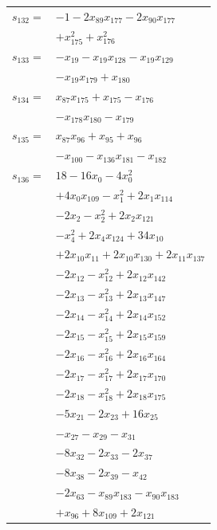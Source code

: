 \begin{longtable}{@{}r@{\;}l@{}}
\(s_{132}=\) & \(\displaystyle -1 -2x_{89}x_{177} -2x_{90}x_{177}\) \\
 & \(\displaystyle +x_{175}^{2} +x_{176}^{2}\) \\[3pt]
\(s_{133}=\) & \(\displaystyle -x_{19} -x_{19}x_{128} -x_{19}x_{129}\) \\
 & \(\displaystyle -x_{19}x_{179} +x_{180}\) \\[3pt]
\(s_{134}=\) & \(\displaystyle x_{87}x_{175} +x_{175} -x_{176}\) \\
 & \(\displaystyle -x_{178}x_{180} -x_{179}\) \\[3pt]
\(s_{135}=\) & \(\displaystyle x_{87}x_{96} +x_{95} +x_{96}\) \\
 & \(\displaystyle -x_{100} -x_{136}x_{181} -x_{182}\) \\[3pt]
\(s_{136}=\) & \(\displaystyle 18 -16x_{0} -4x_{0}^{2}\) \\
 & \(\displaystyle +4x_{0}x_{109} -x_{1}^{2} +2x_{1}x_{114}\) \\
 & \(\displaystyle -2x_{2} -x_{2}^{2} +2x_{2}x_{121}\) \\
 & \(\displaystyle -x_{4}^{2} +2x_{4}x_{124} +34x_{10}\) \\
 & \(\displaystyle +2x_{10}x_{11} +2x_{10}x_{130} +2x_{11}x_{137}\) \\
 & \(\displaystyle -2x_{12} -x_{12}^{2} +2x_{12}x_{142}\) \\
 & \(\displaystyle -2x_{13} -x_{13}^{2} +2x_{13}x_{147}\) \\
 & \(\displaystyle -2x_{14} -x_{14}^{2} +2x_{14}x_{152}\) \\
 & \(\displaystyle -2x_{15} -x_{15}^{2} +2x_{15}x_{159}\) \\
 & \(\displaystyle -2x_{16} -x_{16}^{2} +2x_{16}x_{164}\) \\
 & \(\displaystyle -2x_{17} -x_{17}^{2} +2x_{17}x_{170}\) \\
 & \(\displaystyle -2x_{18} -x_{18}^{2} +2x_{18}x_{175}\) \\
 & \(\displaystyle -5x_{21} -2x_{23} +16x_{25}\) \\
 & \(\displaystyle -x_{27} -x_{29} -x_{31}\) \\
 & \(\displaystyle -8x_{32} -2x_{33} -2x_{37}\) \\
 & \(\displaystyle -8x_{38} -2x_{39} -x_{42}\) \\
 & \(\displaystyle -2x_{63} -x_{89}x_{183} -x_{90}x_{183}\) \\
 & \(\displaystyle +x_{96} +8x_{109} +2x_{121}\) \\

\end{longtable}
